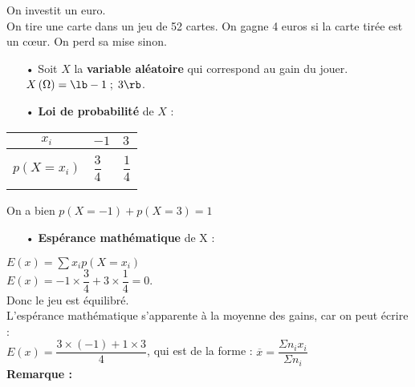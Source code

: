 On investit un euro. \\ On tire une carte dans un jeu de 52 cartes. On gagne 4 euros si la carte tirée est un cœur. On perd sa mise sinon. \\

\begin{itemize}
\item[•] Soit $X$ la \textbf{variable aléatoire} qui correspond au gain du jouer. \\ 

$X\left(\Omega\right) = \lb -1 \; ; \; 3 \rb$. \\
\item[•] \textbf{Loi de probabilité} de $X$ : \\
\end{itemize}

\begin{tabular}{|c|l|l|}
\hline
$x_i$ & $-1$ & $3$ \\
\hline
& & \\
$p\left(X = x_i\right)$ & $\dfrac{3}{4}$ & $\dfrac{1}{4}$ \\
& & \\
\hline
\end{tabular}

\vspace*{.3cm}

On a bien $p\left(X = -1\right) + p\left(X = 3\right) = 1$ \\

\begin{itemize}
\item[•] \textbf{Espérance mathématique} de X : \\
\end{itemize}

$E(x) = \displaystyle \sum  x_ip\left(X = x_i\right)$ \\

$ E(x) = -1 \times \dfrac{3}{4} + 3 \times \dfrac{1}{4} = 0$. \\

Donc le jeu est équilibré. \\

L'espérance mathématique s'apparente à la moyenne des gains, car on peut écrire : \\

$E(x) = \dfrac{3 \times \left(-1\right)+ 1 \times 3}{4}$, qui est de la forme : $\overline{x} = \dfrac{\Sigma n_ix_i}{\Sigma n_i}$ \\

\textbf{Remarque :} \\

